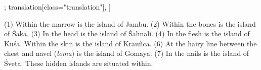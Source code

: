 \begin{alignment}[
  texts=edition[class="edition"];
  translation[class="translation"],
  ]
\begin{translation}
\begin{tlate}[p36_01]
(1) Within the marrow is the island of Jambu. (2) Within the bones is the island of Śāka. (3) In the head is the island of Śālmali. (4) In the flesh is the island of Kuśa. Within the skin is the island of Krauñca. (6) At the hairy line between the chest and navel (\textit{loma}) is the island of Gomaya. (7) In the nails is the island of Śveta. These hidden islands are situated within.
\flushpage
\end{tlate}
  \end{translation}
\end{alignment}
\pagebreak %

